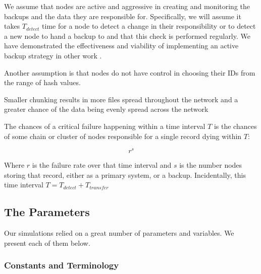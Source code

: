 We assume that nodes are active and aggressive in creating and monitoring the backups and the data they are responsible for.
Specifically, we will assume it takes  $T_{detect}$ time for a node to detect a change in their responsibility or to detect a new node to hand a backup to and that this check is performed regularly. 
We have demonstrated the effectiveness and viability of implementing an active backup strategy in other work \cite{chordreduce} \cite{urdht}.


Another assumption is that nodes do not have control in choosing their IDs from the range of hash values.

Smaller chunking results in more files spread throughout the  network and a greater chance of the data being evenly spread across the network 

The chances of a critical failure happening within a time interval $ T $ is the chances of some chain or cluster of nodes responsible for a single record dying within $ T $:

$$r^{s}$$

Where $ r $ is the failure rate over that time interval and $s$ is the number nodes storing that record, either as a primary system, or a backup.
Incidentally, this time interval $T = T_{detect} + T_{transfer} $



\subsection{The Parameters}

Our simulations relied on a great number of parameters and variables.
We present each of them below.

\subsubsection{Constants and Terminology}

